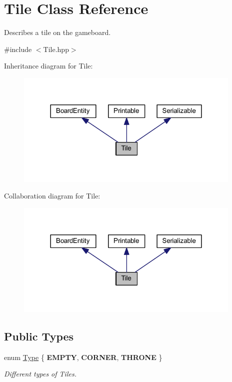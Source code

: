 \hypertarget{class_tile}{\section{Tile Class Reference}
\label{class_tile}
}


Describes a tile on the gameboard.  




{\ttfamily \#include $<$Tile.\-hpp$>$}



Inheritance diagram for Tile\-:\nopagebreak
\begin{figure}[H]
\begin{center}
\leavevmode
\includegraphics[width=306pt]{class_tile__inherit__graph}
\end{center}
\end{figure}


Collaboration diagram for Tile\-:\nopagebreak
\begin{figure}[H]
\begin{center}
\leavevmode
\includegraphics[width=306pt]{class_tile__coll__graph}
\end{center}
\end{figure}
\subsection*{Public Types}
\begin{DoxyCompactItemize}
\item 
enum \hyperlink{class_tile_afa5ef05a7f2ea1f3e44398c001abc738}{Type} \{ {\bfseries E\-M\-P\-T\-Y}, 
{\bfseries C\-O\-R\-N\-E\-R}, 
{\bfseries T\-H\-R\-O\-N\-E}
 \}
\begin{DoxyCompactList}\small\item\em Different types of Tiles. \end{DoxyCompactList}\end{DoxyCompactItemize}
